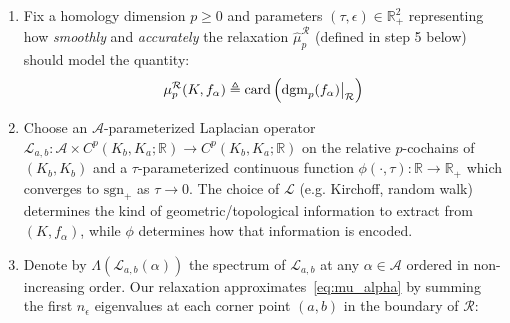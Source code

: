 \documentclass[10pt]{article}
\newenvironment{boxedenumerate}
  {\begin{mdframed}[font=\small, linewidth=1pt]}
  {\end{mdframed}}
\numberwithin{equation}{section}
\newcommand{\+}{%
	\raisebox{0.18ex}{\scaleobj{0.55}{+}}
}
\newcommand\restr[2]{{%
  \left.\kern-\nulldelimiterspace %
  #1 %
  \vphantom{\big|} %
  \right|_{#2} %
  }}
\theoremstyle{definition}
\theoremstyle{definition}
\begin{document}
\begin{boxedenumerate}
\begin{enumerate}
	\item Fix a homology dimension $p\geq 0$ and parameters $(\tau, \epsilon) \in \mathbb{R}_+^2$ representing how \emph{smoothly} and \emph{accurately} the relaxation $\hat{\mu}_p^\mathcal{R}$ (defined in step 5 below) should model the quantity: 
	\begin{equation}\label{eq:mu_alpha}
	\mu_p^{\mathcal{R}}(K, f_\alpha) \triangleq 
	\mathrm{card}\left(\restr{\mathrm{dgm}_p(f_\alpha)}{\mathcal{R}} \right) 
	\end{equation}
	\item Choose an $\mathcal{A}$-parameterized Laplacian operator $\mathcal{L}_{a,b} : \mathcal{A} \times C^p(K_b, K_a; \mathbb{R}) \to C^p(K_b, K_a; \mathbb{R})$ on the relative $p$-cochains of $(K_b, K_b)$ and a 
	$\tau$-parameterized continuous function $\phi(\cdot , \tau ) : \mathbb{R} \to \mathbb{R}_+$ which converges to $\mathrm{sgn}_+$ as $\tau \to 0$.
The choice of $\mathcal{L}$ (e.g. Kirchoff, random walk) determines the kind of geometric/topological information to extract from $(K, f_\alpha)$, while $\phi$ determines how that information is encoded.
	\item Denote by $\Lambda(\mathcal{L}_{a,b}(\alpha))$ the spectrum of $\mathcal{L}_{a,b}$ at any $\alpha \in \mathcal{A}$ ordered in non-increasing order. Our relaxation approximates~\eqref{eq:mu_alpha} by summing the first $n_\epsilon$ eigenvalues at each corner point $(a,b)$ in the boundary of $\mathcal{R}$: 

\end{enumerate}
\end{boxedenumerate}
\end{document}
